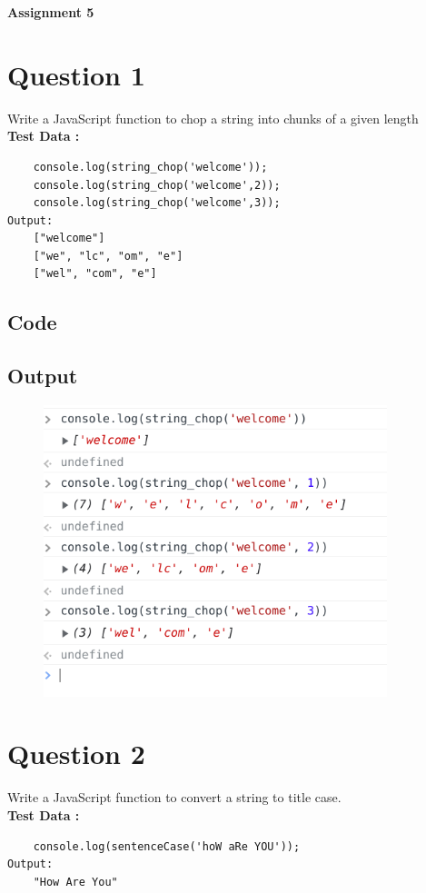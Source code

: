\documentclass{article}
\begin{document}
{\centerline{\bfseries \Huge Assignment 5}}

\section*{Question 1}
Write a JavaScript function to chop a string into chunks of a given length\\
\textbf{Test Data :}
\begin{lstlisting}
    console.log(string_chop('welcome'));
    console.log(string_chop('welcome',2));
    console.log(string_chop('welcome',3));
Output:
    ["welcome"]
    ["we", "lc", "om", "e"]
    ["wel", "com", "e"]
\end{lstlisting}
\subsection*{Code}

\newpage
\subsection*{Output}
\begin{figure}[H]
  \centering
  \includegraphics[width=10cm]{1/out.png}
\end{figure}

\newpage
\section*{Question 2}
Write a JavaScript function to convert a string to title case. \\
\textbf{Test Data :}
\begin{lstlisting}
    console.log(sentenceCase('hoW aRe YOU'));
Output:
    "How Are You"
\end{lstlisting}
\end{document}
